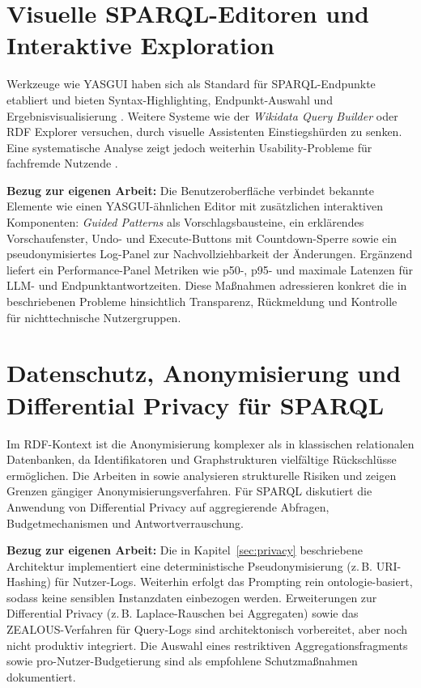 \section{Visuelle SPARQL-Editoren und Interaktive Exploration}

Werkzeuge wie YASGUI haben sich als Standard für SPARQL-Endpunkte etabliert und bieten Syntax-Highlighting, Endpunkt-Auswahl und Ergebnisvisualisierung \cite{yasgui}. Weitere Systeme wie der \emph{Wikidata Query Builder} oder RDF Explorer \cite{vargas-rdf-explorer} versuchen, durch visuelle Assistenten Einstiegshürden zu senken. Eine systematische Analyse zeigt jedoch weiterhin Usability-Probleme für fachfremde Nutzende \cite{kuric-usability}.

\textbf{Bezug zur eigenen Arbeit:} Die Benutzeroberfläche verbindet bekannte Elemente wie einen YASGUI-ähnlichen Editor mit zusätzlichen interaktiven Komponenten: \textit{Guided Patterns} als Vorschlagsbausteine, ein erklärendes Vorschaufenster, Undo- und Execute-Buttons mit Countdown-Sperre sowie ein pseudonymisiertes Log-Panel zur Nachvollziehbarkeit der Änderungen. Ergänzend liefert ein Performance-Panel Metriken wie p50-, p95- und maximale Latenzen für LLM- und Endpunktantwortzeiten. Diese Maßnahmen adressieren konkret die in \cite{kuric-usability} beschriebenen Probleme hinsichtlich Transparenz, Rückmeldung und Kontrolle für nichttechnische Nutzergruppen.

\section{Datenschutz, Anonymisierung und Differential Privacy für SPARQL}

Im RDF-Kontext ist die Anonymisierung komplexer als in klassischen relationalen Datenbanken, da Identifikatoren und Graphstrukturen vielfältige Rückschlüsse ermöglichen. Die Arbeiten in \cite{logical-foundations-lda} sowie \cite{delanaux-linkage} analysieren strukturelle Risiken und zeigen Grenzen gängiger Anonymisierungsverfahren. Für SPARQL diskutiert \cite{builaranda-dp-sparql} die Anwendung von Differential Privacy auf aggregierende Abfragen, Budgetmechanismen und Antwortverrauschung.

\textbf{Bezug zur eigenen Arbeit:} Die in Kapitel~\ref{sec:privacy} beschriebene Architektur implementiert eine deterministische Pseudonymisierung (z.\,B. URI-Hashing) für Nutzer-Logs. Weiterhin erfolgt das Prompting rein ontologie-basiert, sodass keine sensiblen Instanzdaten einbezogen werden. Erweiterungen zur Differential Privacy (z.\,B. Laplace-Rauschen bei Aggregaten) sowie das ZEALOUS-Verfahren für Query-Logs sind architektonisch vorbereitet, aber noch nicht produktiv integriert. Die Auswahl eines restriktiven Aggregationsfragments sowie pro-Nutzer-Budgetierung sind als empfohlene Schutzmaßnahmen dokumentiert.

